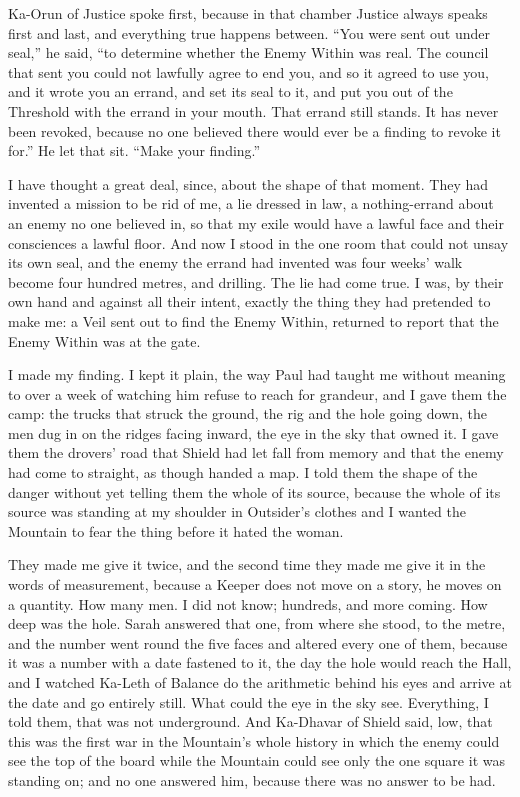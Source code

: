 Ka-Orun of Justice spoke first, because in that chamber Justice always speaks first and last, and everything true happens between. ``You were sent out under seal,'' he said, ``to determine whether the Enemy Within was real. The council that sent you could not lawfully agree to end you, and so it agreed to use you, and it wrote you an errand, and set its seal to it, and put you out of the Threshold with the errand in your mouth. That errand still stands. It has never been revoked, because no one believed there would ever be a finding to revoke it for.'' He let that sit. ``Make your finding.''\par

I have thought a great deal, since, about the shape of that moment. They had invented a mission to be rid of me, a lie dressed in law, a nothing-errand about an enemy no one believed in, so that my exile would have a lawful face and their consciences a lawful floor. And now I stood in the one room that could not unsay its own seal, and the enemy the errand had invented was four weeks' walk become four hundred metres, and drilling. The lie had come true. I was, by their own hand and against all their intent, exactly the thing they had pretended to make me: a Veil sent out to find the Enemy Within, returned to report that the Enemy Within was at the gate.\par

\ornament

I made my finding. I kept it plain, the way Paul had taught me without meaning to over a week of watching him refuse to reach for grandeur, and I gave them the camp: the trucks that struck the ground, the rig and the hole going down, the men dug in on the ridges facing inward, the eye in the sky that owned it. I gave them the drovers' road that Shield had let fall from memory and that the enemy had come to straight, as though handed a map. I told them the shape of the danger without yet telling them the whole of its source, because the whole of its source was standing at my shoulder in Outsider's clothes and I wanted the Mountain to fear the thing before it hated the woman.\par

They made me give it twice, and the second time they made me give it in the words of measurement, because a Keeper does not move on a story, he moves on a quantity. How many men. I did not know; hundreds, and more coming. How deep was the hole. Sarah answered that one, from where she stood, to the metre, and the number went round the five faces and altered every one of them, because it was a number with a date fastened to it, the day the hole would reach the Hall, and I watched Ka-Leth of Balance do the arithmetic behind his eyes and arrive at the date and go entirely still. What could the eye in the sky see. Everything, I told them, that was not underground. And Ka-Dhavar of Shield said, low, that this was the first war in the Mountain's whole history in which the enemy could see the top of the board while the Mountain could see only the one square it was standing on; and no one answered him, because there was no answer to be had.\par

